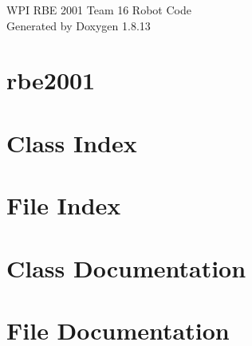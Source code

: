 \documentclass[twoside]{book}
\newcommand{\+}{\discretionary{\mbox{\scriptsize$\hookleftarrow$}}{}{}}
\newcommand{\clearemptydoublepage}{%
  \newpage{\pagestyle{empty}\cleardoublepage}%
}
\begin{document}
\hypersetup{pageanchor=false,
             bookmarksnumbered=true,
             pdfencoding=unicode
            }
\begin{titlepage}
\vspace*{7cm}
\begin{center}%
{\Large W\+PI R\+BE 2001 Team 16 Robot Code }\\
\vspace*{1cm}
{\large Generated by Doxygen 1.8.13}\\
\end{center}
\end{titlepage}
\clearemptydoublepage
{}
\tableofcontents
\clearemptydoublepage
{}
\hypersetup{pageanchor=true}

\chapter{rbe2001}
\label{md_rbe2001__r_e_a_d_m_e}

\chapter{Class Index}

\chapter{File Index}

\chapter{Class Documentation}









\chapter{File Documentation}
































\backmatter
\newpage
{}
\clearemptydoublepage
{}
\printindex
\end{document}
